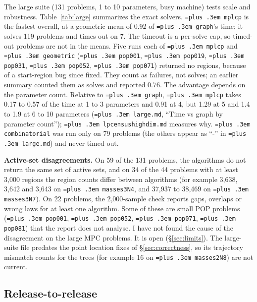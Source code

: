 \documentclass[10pt,a4paper]{article}
\newcommand{\busy}{$^\dagger$}
\newcommand{\code}[1]{{\let\_\bu\texttt{\spaceskip=\fontdimen2\font plus .3em #1}}}
\newcommand{\bu}{\textunderscore\hspace{0pt}}
\begin{document}
The large suite (131 problems, 1 to 10 parameters, busy machine) tests scale and robustness. Table~\ref{tab:large} summarizes the exact
solvers. \code{mplcp} is the fastest overall, at a geometric mean of 0.92 of \code{graph}'s time; it solves 119 problems and times out on 7. The timeout is a per-solve cap, so timed-out problems are not in the means. Five runs each of \code{mplcp} and \code{geometric} (\code{pop\_001}, \code{pop\_019}, \code{pop\_031}, \code{pop\_052}, \code{pop\_071}) returned no regions, because of a start-region bug since fixed. They count as failures, not solves; an earlier summary counted them as solves and reported 0.76.
The advantage depends on the parameter count. Relative to \code{graph}, \code{mplcp} takes 0.17 to 0.57 of the time at 1 to 3 parameters and 0.91 at 4, but 1.29 at 5 and 1.4 to 1.9 at 6 to 10 parameters (\code{large.md}, ``Time vs graph by parameter count''); \code{lp\_census\_highdim.md} measures why.
\code{combinatorial} was run only on 79 problems (the others appear as ``-'' in \code{large.md}) and never timed out.

\begin{table}[!htbp]
\centering\small
\caption{Large suite summary\busy{}: problems solved, timed out and geometric-mean time relative to \code{graph} on the problems both solved (\code{large.md}).}
\label{tab:large}

\end{table}

\textbf{Active-set disagreements.} On 59 of the 131 problems, the algorithms do not return the same set of active sets, and on 34 of the 44 problems with at
least 3,000 regions the region counts differ between algorithms (for example 3,638, 3,642 and 3,643 on \code{masses3\_N4}, and 37,937 to 38,469 on \code{masses3\_N7}). On 22
problems, the 2,000-sample check reports gaps, overlaps or wrong laws for at least one algorithm. Some of these are small POP problems (\code{pop\_001}, \code{pop\_052},
\code{pop\_071}, \code{pop\_081}) that the report does not analyse. I have not found the cause of the disagreement on the large MPC problems. It is open
(\S\ref{sec:limits}). The large-suite file predates the point location fixes of \S\ref{sec:correctness}, so its trajectory mismatch counts for the trees (for example 16 on \code{masses2\_N8}) are not current.

\subsection{Release-to-release}
\end{document}

